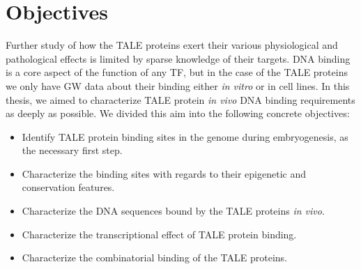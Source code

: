 \chapter{Objectives}
\label{chp:objectives}

Further study of how the \ac{TALE} proteins exert their various physiological and pathological effects is limited by sparse knowledge of their targets. DNA binding is a core aspect of the function of any \ac{TF}, but in the case of the \ac{TALE} proteins we only have \ac{GW} data about their binding either \textit{in vitro} or in cell lines. In this thesis, we aimed to characterize \ac{TALE} protein \textit{in vivo} DNA binding requirements as deeply as possible. We divided this aim into the following concrete objectives:

\begin{itemize}

  \item Identify TALE protein binding sites in the genome during embryogenesis, as the necessary first step.
  
  \item Characterize the binding sites with regards to their epigenetic and conservation features.%
  
  \item Characterize the DNA sequences bound by the TALE proteins \textit{in vivo}.  
  
  \item Characterize the transcriptional effect of TALE protein binding.  
  
  \item Characterize the combinatorial binding of the TALE proteins.
  
  
  
\end{itemize}